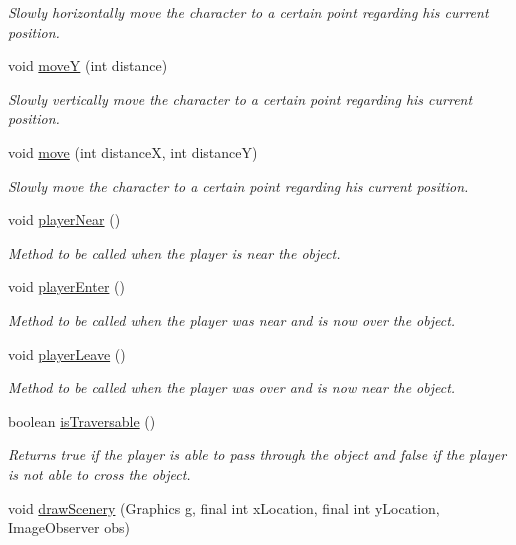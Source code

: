 \begin{DoxyCompactItemize}
\begin{DoxyCompactList}\small\item\em Slowly horizontally move the character to a certain point regarding his current position. \end{DoxyCompactList}\item 
void \hyperlink{a00005_af0dd57e9b3d6a43fec1292f5333f0208}{move\-Y} (int distance)
\begin{DoxyCompactList}\small\item\em Slowly vertically move the character to a certain point regarding his current position. \end{DoxyCompactList}\item 
void \hyperlink{a00005_a69468dde4db9cb9e4ce0838dc6977c8c}{move} (int distance\-X, int distance\-Y)
\begin{DoxyCompactList}\small\item\em Slowly move the character to a certain point regarding his current position. \end{DoxyCompactList}\item 
void \hyperlink{a00005_a367d28c710b44853dd42daf2f35d1de8}{player\-Near} ()
\begin{DoxyCompactList}\small\item\em Method to be called when the player is near the object. \end{DoxyCompactList}\item 
void \hyperlink{a00005_a9e727e0924694a8dcb032d6bb61b30d9}{player\-Enter} ()
\begin{DoxyCompactList}\small\item\em Method to be called when the player was near and is now over the object. \end{DoxyCompactList}\item 
void \hyperlink{a00005_a94b4af7f2a48ad7288e64be4393ffeb2}{player\-Leave} ()
\begin{DoxyCompactList}\small\item\em Method to be called when the player was over and is now near the object. \end{DoxyCompactList}\item 
boolean \hyperlink{a00005_afe899056167497ab0de734cd2f19219a}{is\-Traversable} ()
\begin{DoxyCompactList}\small\item\em Returns true if the player is able to pass through the object and false if the player is not able to cross the object. \end{DoxyCompactList}\item 
void \hyperlink{a00024_a626c1ae7fa15d2f96d564c35368fdbc9}{draw\-Scenery} (Graphics g, final int x\-Location, final int y\-Location, Image\-Observer obs)
\end{DoxyCompactItemize}

